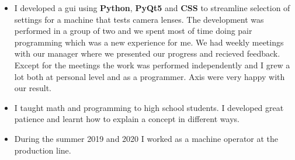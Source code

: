 \documentclass[10pt,a4paper,ragged2e]{altacv}
\begin{document}
\divider

\begin{itemize}
    \item I developed a gui using \textbf{Python}, \textbf{PyQt5} and \textbf{CSS} to streamline selection of settings
    for a machine that tests camera lenses. The development was performed in a group of two and we spent most of time 
    doing pair programming which was a new experience for me. We had weekly meetings with our manager where we presented
    our progress and recieved feedback. Except for the meetings the work was performed independently and I grew 
    a lot both at personal level and as a programmer. Axis were very happy with our result.
\end{itemize}

\divider

    \begin{itemize}
    \item I taught math and programming to high school students. 
    I developed great patience and learnt how to explain a concept in different ways.
\end{itemize}

\divider

\begin{itemize}
    \item During the summer 2019 and 2020 I worked as a machine operator at the production 
    line.
\end{itemize}

\newpage
\end{document}
